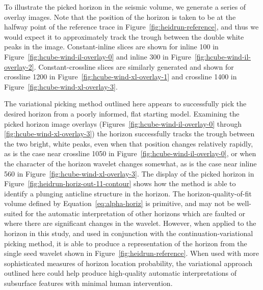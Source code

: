
To illustrate the picked horizon in the seismic volume, we generate a series of overlay images.  Note that the position of the horizon is taken to be at the halfway point of the reference trace in Figure~\ref{fig:heidrun-reference}, and thus we would expect it to approximately  track the trough between the double white peaks in the image.  Constant-inline slices are shown for inline 100 in Figure~\ref{fig:hcube-wind-il-overlay-0} and  inline 300 in Figure~\ref{fig:hcube-wind-il-overlay-2}. Constant-crossline slices are similarly generated and shown for crossline 1200 in Figure~\ref{fig:hcube-wind-xl-overlay-1} and crossline 1400 in Figure~\ref{fig:hcube-wind-xl-overlay-3}.



The variational picking method outlined here appears to successfully pick the desired horizon from a poorly informed, flat starting model.  Examining the picked horizon image overlays (Figures~\ref{fig:hcube-wind-il-overlay-0} through \ref{fig:hcube-wind-xl-overlay-3}) the horizon successfully tracks the trough between the two bright, white peaks, even when that position changes relatively rapidly, as is the case near crossline 1050 in Figure~\ref{fig:hcube-wind-il-overlay-0}, or when the character of the horizon wavelet changes somewhat, as is the case near inline 560 in Figure~\ref{fig:hcube-wind-xl-overlay-3}.  The display of the picked horizon in Figure~\ref{fig:heidrun-horiz-out-11-contour} shows how the method is able to identify a plunging anticline structure in the horizon. The horizon-quality-of-fit volume defined by Equation~\ref{eq:alpha-horiz} is primitive, and may not be well-suited for the automatic interpretation of other horizons which are faulted or where there are significant changes in the wavelet.  However, when applied to the horizon in this study, and used in conjunction with the continuation-variational picking method, it is able to produce a representation of the horizon from the single seed wavelet shown in Figure~\ref{fig:heidrun-reference}.  When used with more sophisticated measures of horizon location probability, the variational approach outlined here could help produce high-quality automatic interpretations of subsurface features with minimal human intervention.

